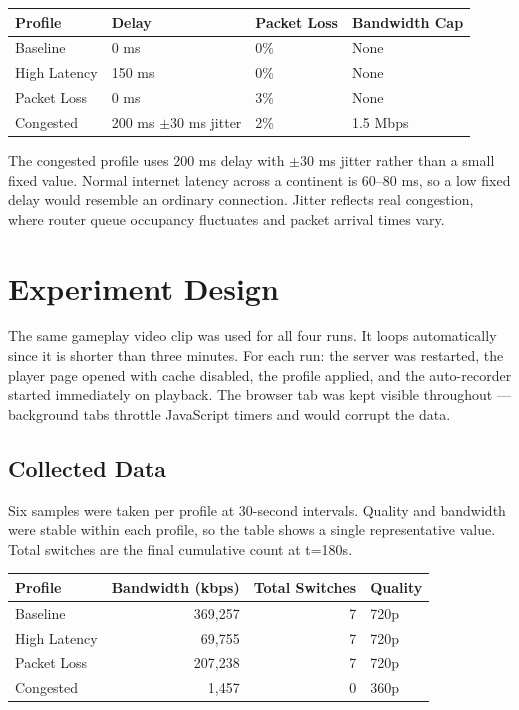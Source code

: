 \documentclass[12pt]{article}
\begin{document}
\begin{center}
\begin{tabular}{>{\raggedright}p{2.6cm} >{\raggedright}p{3.8cm} l l}
\toprule
Profile & Delay & Packet Loss & Bandwidth Cap \\
\midrule
Baseline     & 0 ms                     & 0\% & None      \\
High Latency & 150 ms                   & 0\% & None      \\
Packet Loss  & 0 ms                     & 3\% & None      \\
Congested    & 200 ms $\pm$30 ms jitter & 2\% & 1.5 Mbps  \\
\bottomrule
\end{tabular}
\end{center}

The congested profile uses 200 ms delay with $\pm$30 ms jitter rather than a small fixed value. Normal internet latency across a continent is 60--80 ms, so a low fixed delay would resemble an ordinary connection. Jitter reflects real congestion, where router queue occupancy fluctuates and packet arrival times vary.

\section{Experiment Design}

The same gameplay video clip was used for all four runs. It loops automatically since it is shorter than three minutes. For each run: the server was restarted, the player page opened with cache disabled, the profile applied, and the auto-recorder started immediately on playback. The browser tab was kept visible throughout — background tabs throttle JavaScript timers and would corrupt the data.

\subsection{Collected Data}

Six samples were taken per profile at 30-second intervals. Quality and bandwidth were stable within each profile, so the table shows a single representative value. Total switches are the final cumulative count at t=180s.

\begin{center}
\begin{tabular}{lrrl}
\toprule
Profile & Bandwidth (kbps) & Total Switches & Quality \\
\midrule
Baseline     & 369,257 & 7 & 720p \\
High Latency &  69,755 & 7 & 720p \\
Packet Loss  & 207,238 & 7 & 720p \\
Congested    &   1,457 & 0 & 360p \\
\bottomrule
\end{tabular}
\end{center}
\end{document}
